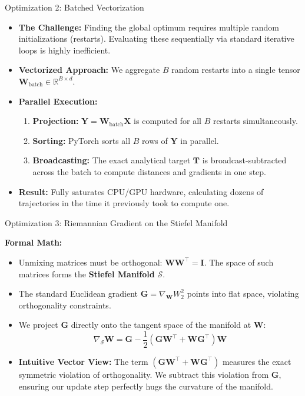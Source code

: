\documentclass{beamer}
\begin{document}
\begin{frame}{Optimization 2: Batched Vectorization}
  \begin{itemize}
    \item \textbf{The Challenge:} Finding the global optimum requires multiple random initializations (restarts). Evaluating these sequentially via standard iterative loops is highly inefficient.
    \item \textbf{Vectorized Approach:} We aggregate $B$ random restarts into a single tensor $\mathbf{W}_{\text{batch}} \in \mathbb{R}^{B \times d}$.
    \item \textbf{Parallel Execution:} 
      \begin{enumerate}
          \item \textbf{Projection:} $\mathbf{Y} = \mathbf{W}_{\text{batch}} \mathbf{X}$ is computed for all $B$ restarts simultaneously.
          \item \textbf{Sorting:} PyTorch sorts all $B$ rows of $\mathbf{Y}$ in parallel.
          \item \textbf{Broadcasting:} The exact analytical target $\mathbf{T}$ is broadcast-subtracted across the batch to compute distances and gradients in one step.
      \end{enumerate}
    \item \textbf{Result:} Fully saturates CPU/GPU hardware, calculating dozens of trajectories in the time it previously took to compute one.
  \end{itemize}
\end{frame}

\begin{frame}{Optimization 3: Riemannian Gradient on the Stiefel Manifold}
  
  \textbf{Formal Math:}
  \begin{itemize}
    \item Unmixing matrices must be orthogonal: $\mathbf{W}\mathbf{W}^\top = \mathbf{I}$. The space of such matrices forms the \textbf{Stiefel Manifold} $\mathcal{S}$.
    \item The standard Euclidean gradient $\mathbf{G} = \nabla_{\mathbf{W}} W_2^2$ points into flat space, violating orthogonality constraints.
    \item We project $\mathbf{G}$ directly onto the tangent space of the manifold at $\mathbf{W}$:
      \[
        \nabla_{\mathcal{S}} \mathbf{W} = \mathbf{G} - \frac{1}{2}\left(\mathbf{G}\mathbf{W}^\top + \mathbf{W}\mathbf{G}^\top \right)\mathbf{W}
      \]
    \item \textbf{Intuitive Vector View:} The term $(\mathbf{G}\mathbf{W}^\top + \mathbf{W}\mathbf{G}^\top)$ measures the exact symmetric violation of orthogonality. We subtract this violation from $\mathbf{G}$, ensuring our update step perfectly hugs the curvature of the manifold.
  \end{itemize}
\end{frame}
\end{document}
